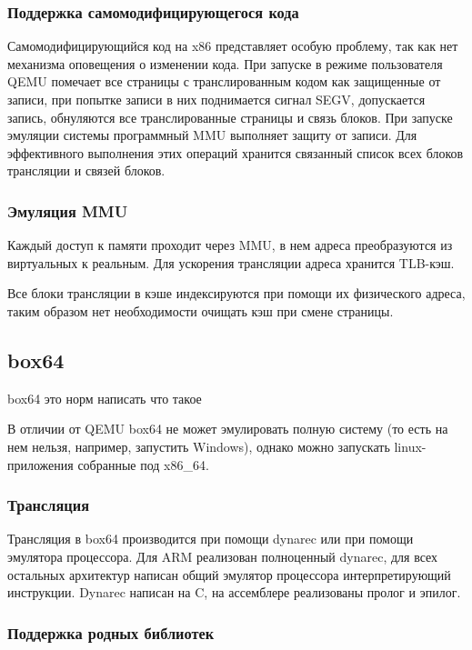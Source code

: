 \subsubsection{Поддержка самомодифицирующегося кода}

Самомодифицирующийся код на x86 представляет особую проблему, так как нет механизма оповещения о изменении кода. При запуске в режиме пользователя QEMU помечает все страницы с транслированным кодом как защищенные от записи, при попытке записи в них поднимается сигнал SEGV, допускается запись, обнуляются все транслированные страницы и связь блоков. При запуске эмуляции системы программный MMU выполняет защиту от записи.
Для эффективного выполнения этих операций хранится связанный список всех блоков трансляции и связей блоков.

\subsubsection{Эмуляция MMU}

Каждый доступ к памяти проходит через MMU, в нем адреса преобразуются из виртуальных к реальным. Для ускорения трансляции адреса хранится TLB-кэш.

Все блоки трансляции в кэше индексируются при помощи их физического адреса, таким образом нет необходимости очищать кэш при смене страницы. \cite{qemu_docs}

\subsection{box64}

box64 это норм написать что такое

В отличии от QEMU box64 не может эмулировать полную систему (то есть на нем нельзя, например, запустить Windows), однако можно запускать linux-приложения собранные под x86\_64.

\subsubsection{Трансляция}

Трансляция в box64 производится при помощи dynarec или при помощи эмулятора процессора. Для ARM реализован полноценный dynarec, для всех остальных архитектур написан общий эмулятор процессора интерпретирующий инструкции. Dynarec написан на C, на ассемблере реализованы пролог и эпилог.

\subsubsection{Поддержка родных библиотек}

